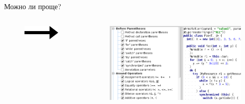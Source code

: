 \documentclass[sans]{beamer}
\begin{document}
\begin{frame}{Можно ли проще?}
\begin{columns}
		\begin{column}{.1\textwidth}
			\begin{figure}
				\includegraphics[width = \linewidth]{images/arrow.png}
			\end{figure}
		\end{column}

		\begin{column}{.4\textwidth}
			\begin{figure}
				\includegraphics[width = \linewidth]{images/snapshot1.png}
			\end{figure}
		\end{column}
	\end{columns}
\end{frame}
\end{document}
